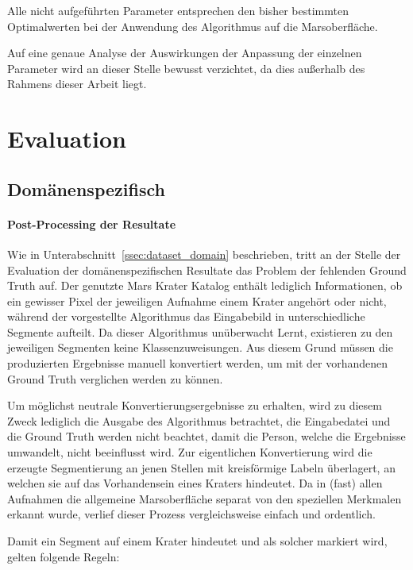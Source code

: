 Alle nicht aufgeführten Parameter entsprechen den bisher bestimmten Optimalwerten bei der Anwendung des Algorithmus auf die Marsoberfläche.

Auf eine genaue Analyse der Auswirkungen der Anpassung der einzelnen Parameter wird an dieser Stelle bewusst verzichtet, da dies außerhalb des Rahmens dieser Arbeit liegt.

\section{Evaluation}
\label{sec:evaluation}

\subsection{Domänenspezifisch}
\label{ssec:evaluation_domain}

\paragraph{Post-Processing der Resultate}
\label{ssec:postprocessing}

Wie in Unterabschnitt~\ref{ssec:dataset_domain} beschrieben, tritt an der Stelle der Evaluation der domänenspezifischen Resultate das Problem der fehlenden Ground Truth auf. Der genutzte Mars Krater Katalog \cite{robbins_12} enthält lediglich Informationen, ob ein gewisser Pixel der jeweiligen Aufnahme einem Krater angehört oder nicht, während der vorgestellte Algorithmus das Eingabebild in unterschiedliche Segmente aufteilt. Da dieser Algorithmus unüberwacht Lernt, existieren zu den jeweiligen Segmenten keine Klassenzuweisungen. Aus diesem Grund müssen die produzierten Ergebnisse manuell konvertiert werden, um mit der vorhandenen Ground Truth verglichen werden zu können.

Um möglichst neutrale Konvertierungsergebnisse zu erhalten, wird zu diesem Zweck lediglich die Ausgabe des Algorithmus betrachtet, die Eingabedatei und die Ground Truth werden nicht beachtet, damit die Person, welche die Ergebnisse umwandelt, nicht beeinflusst wird. Zur eigentlichen Konvertierung wird die erzeugte Segmentierung an jenen Stellen mit kreisförmige Labeln überlagert, an welchen sie auf das Vorhandensein eines Kraters hindeutet. Da in (fast) allen Aufnahmen die allgemeine Marsoberfläche separat von den speziellen Merkmalen erkannt wurde, verlief dieser Prozess vergleichsweise einfach und ordentlich.

Damit ein Segment auf einem Krater hindeutet und als solcher markiert wird, gelten folgende Regeln:

